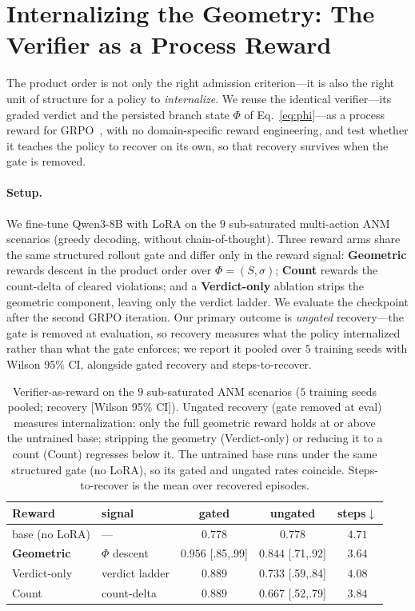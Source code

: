 \section{Internalizing the Geometry: The Verifier as a Process Reward}
\label{sec:reward}

The product order is not only the right admission criterion---it is also the right unit of structure for a policy to \emph{internalize}. We reuse the identical verifier---its graded verdict and the persisted branch state $\Phi$ of Eq.~\ref{eq:phi}---as a process reward for GRPO~\cite{deepseekmath2024grpo,lightman2024prm}, with no domain-specific reward engineering, and test whether it teaches the policy to recover on its own, so that recovery survives when the gate is removed.

\paragraph{Setup.}
We fine-tune Qwen3-8B with LoRA on the $9$ sub-saturated multi-action ANM scenarios (greedy decoding, without chain-of-thought). Three reward arms share the same structured rollout gate and differ only in the reward signal: \textbf{Geometric} rewards descent in the product order over $\Phi=(S,\sigma)$; \textbf{Count} rewards the count-delta of cleared violations; and a \textbf{Verdict-only} ablation strips the geometric component, leaving only the verdict ladder. We evaluate the checkpoint after the second GRPO iteration. Our primary outcome is \emph{ungated} recovery---the gate is removed at evaluation, so recovery measures what the policy internalized rather than what the gate enforces; we report it pooled over $5$ training seeds with Wilson 95\% CI, alongside gated recovery and steps-to-recover.

\begin{table}[t]
\centering
\caption{Verifier-as-reward on the $9$ sub-saturated ANM scenarios ($5$ training seeds pooled; recovery [Wilson 95\% CI]). Ungated recovery (gate removed at eval) measures internalization: only the full geometric reward holds at or above the untrained base; stripping the geometry (Verdict-only) or reducing it to a count (Count) regresses below it. The untrained base runs under the same structured gate (no LoRA), so its gated and ungated rates coincide. Steps-to-recover is the mean over recovered episodes.}
\label{tab:reward}
\begin{tabular}{llccc}
\toprule
Reward & signal & gated & \textbf{ungated} & steps$\downarrow$ \\
\midrule
base (no LoRA) & --- & $0.778$ & $0.778$ & $4.71$ \\
\textbf{Geometric} & $\Phi$ descent & $\mathbf{0.956}$ [.85,.99] & $\mathbf{0.844}$ [.71,.92] & $\mathbf{3.64}$ \\
Verdict-only & verdict ladder & $0.889$ & $0.733$ [.59,.84] & $4.08$ \\
Count & count-delta & $0.889$ & $0.667$ [.52,.79] & $3.84$ \\
\bottomrule
\end{tabular}
\end{table}

